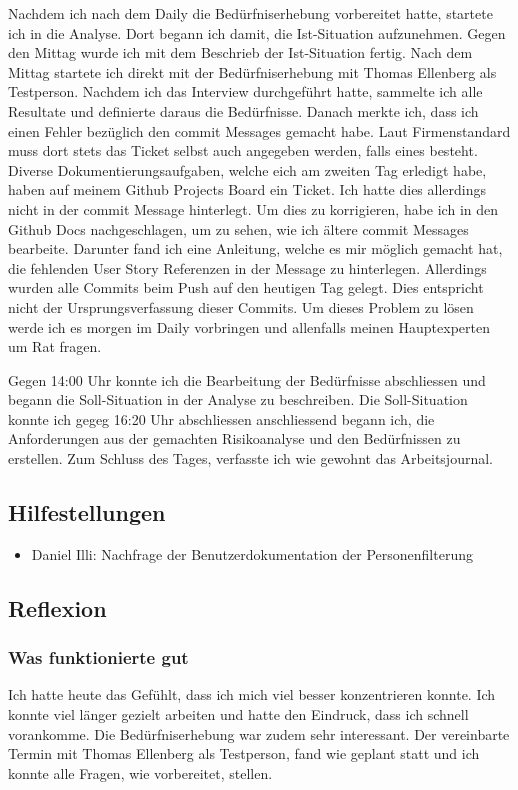 \newpage

Nachdem ich nach dem Daily die Bedürfniserhebung vorbereitet hatte,
startete ich in die Analyse. Dort begann ich damit, die Ist-Situation aufzunehmen. Gegen den Mittag wurde ich mit dem Beschrieb der 
Ist-Situation fertig. Nach dem Mittag startete ich direkt mit der Bedürfniserhebung mit Thomas Ellenberg als Testperson. Nachdem ich das Interview 
durchgeführt hatte, sammelte ich alle Resultate und definierte daraus die Bedürfnisse. Danach merkte ich, dass ich einen Fehler bezüglich den commit Messages gemacht habe.
Laut Firmenstandard muss dort stets das Ticket selbst auch angegeben werden, falls eines besteht. Diverse Dokumentierungsaufgaben, welche eich am zweiten Tag erledigt habe,
haben auf meinem Github Projects Board ein Ticket. Ich hatte dies allerdings nicht in der commit Message hinterlegt. Um dies zu korrigieren, habe ich in den Github Docs nachgeschlagen,
um zu sehen, wie ich ältere commit Messages bearbeite. Darunter fand ich eine Anleitung, welche es mir möglich gemacht hat, die fehlenden User Story Referenzen in der 
Message zu hinterlegen. Allerdings wurden alle Commits beim Push auf den heutigen Tag gelegt. Dies entspricht nicht der Ursprungsverfassung dieser Commits.
Um dieses Problem zu lösen werde ich es morgen im Daily vorbringen und allenfalls meinen Hauptexperten um Rat fragen.

Gegen 14:00 Uhr konnte ich die Bearbeitung der Bedürfnisse
abschliessen und begann die Soll-Situation in der Analyse zu beschreiben. Die Soll-Situation konnte ich gegeg 16:20 Uhr abschliessen anschliessend begann ich,
die Anforderungen aus der gemachten Risikoanalyse und den Bedürfnissen zu erstellen. Zum Schluss des Tages, verfasste ich wie gewohnt das Arbeitsjournal.

\subsection*{Hilfestellungen}
\begin{itemize}
    \item Daniel Illi: Nachfrage der Benutzerdokumentation der Personenfilterung
\end{itemize}

\subsection*{Reflexion}

\subsubsection*{Was funktionierte gut}
Ich hatte heute das Gefühlt, dass ich mich viel besser konzentrieren konnte. Ich konnte viel länger gezielt arbeiten
und hatte den Eindruck, dass ich schnell vorankomme. Die Bedürfniserhebung war zudem sehr interessant. Der vereinbarte Termin
mit Thomas Ellenberg als Testperson, fand wie geplant statt und ich konnte alle Fragen, wie vorbereitet, stellen.

